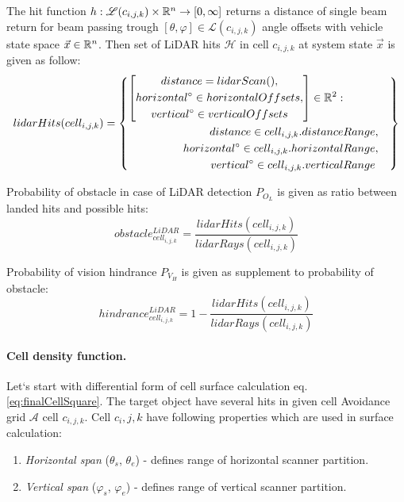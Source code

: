 The hit function $h:\mathscr{L}(c_{i,j,k})\times\mathbb{R}^n\to[0,\infty]$ returns a distance of single beam return for beam passing trough $[\theta,\varphi]\in\mathscr{L}(c_{i,j,k})$ angle offsets with vehicle state space $\vec{x}\in\mathbb{R}^n$. Then set of LiDAR hits $\mathscr{H}$ in cell $c_{i,j,k}$ at system state $\vec{x}$ is given as follow:
\begin{equation}
    lidar Hits(cell_{i,j,k})=\left\{
        \begin{aligned}
        \left[
            \begin{gathered}
                distance=lidarScan(),\\
                horizontal^\circ\in horizontal Offsets,\\
                vertical^\circ\in vertical Offsets
            \end{gathered}
        \right]\in\mathbb{R}^2:&\\
        distance \in cell_{i,j,k}.distance &Range,\\
        horizontal^\circ\in cell_{i,j,k}.horizontal &Range,\\
        vertical^\circ\in cell_{i,j,k}.vertical &Range\\
        \end{aligned}
    \right\}
\end{equation}

\noindent Probability of obstacle in case of LiDAR detection $P_{O_L}$ is given as ratio between landed hits and possible hits:
\begin{equation}
    obstacle^{LiDAR}_{cell_{i,j,k}}=\frac{lidar Hits(cell_{i,j,k})}{lidar Rays(cell_{i,j,k})}
\end{equation}


\noindent Probability of vision hindrance $P_{V_H}$ is given as supplement to probability of obstacle:
\begin{equation}\label{eq:probabilityOfVisibilityHindrance}
    hindrance^{LiDAR}_{cell_{i,j,k}}=1-\frac{lidar Hits(cell_{i,j,k})}{lidar Rays(cell_{i,j,k})}
\end{equation}

\paragraph{Cell density function.}
\noindent Let`s start with differential form of cell surface calculation eq. \ref{eq:finalCellSquare}. The target object have several hits in given cell Avoidance grid $\mathscr{A}$ cell $c_{i,j,k}$. Cell $c_i,j,k$ have following properties which are used in surface calculation:
\begin{enumerate}
    \item \textit{Horizontal span} ($\theta_s$, $\theta_e$) - defines range of horizontal scanner partition.
    \item \textit{Vertical span} ($\varphi_s$, $\varphi_e$) - defines range of vertical scanner partition.
\end{enumerate}

